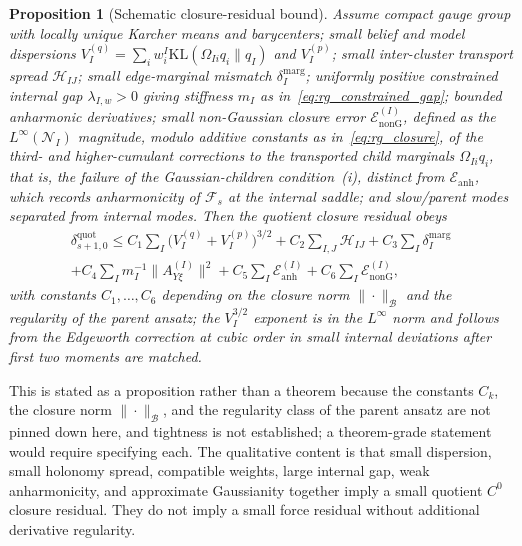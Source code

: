 \documentclass[11pt]{article}
\newtheorem{proposition}{Proposition}
\begin{document}
\begin{proposition}[Schematic closure-residual bound]
\label{thm:rg_residual}
Assume compact gauge group with locally unique Karcher means and barycenters; small belief and model dispersions $V_I^{(q)} = \sum_i w_i^I \mathrm{KL}(\Omega_{Ii}q_i \| q_I)$ and $V_I^{(p)}$; small inter-cluster transport spread $\mathcal{H}_{IJ}$; small edge-marginal mismatch $\delta_I^{\mathrm{marg}}$; uniformly positive constrained internal gap $\lambda_{I,w} > 0$ giving stiffness $m_I$ as in~\eqref{eq:rg_constrained_gap}; bounded anharmonic derivatives; small non-Gaussian closure error $\mathcal{E}_{\mathrm{nonG}}^{(I)}$, defined as the $L^\infty(\mathcal{N}_I)$ magnitude, modulo additive constants as in~\eqref{eq:rg_closure}, of the third- and higher-cumulant corrections to the transported child marginals $\Omega_{Ii}q_i$, that is, the failure of the Gaussian-children condition~(i), distinct from $\mathcal{E}_{\mathrm{anh}}$, which records anharmonicity of $\mathcal{F}_s$ at the internal saddle; and slow/parent modes separated from internal modes. Then the quotient closure residual obeys
\begin{multline}
\delta_{s+1,0}^{\mathrm{quot}} \le C_1\sum_I \big(V_I^{(q)} + V_I^{(p)}\big)^{3/2} + C_2\sum_{I,J}\mathcal{H}_{IJ} + C_3\sum_I \delta_I^{\mathrm{marg}} \\
 + C_4\sum_I m_I^{-1}\|A_{Y\xi}^{(I)}\|^2 + C_5\sum_I \mathcal{E}_{\mathrm{anh}}^{(I)} + C_6\sum_I \mathcal{E}_{\mathrm{nonG}}^{(I)},
\end{multline}
with constants $C_1, \ldots, C_6$ depending on the closure norm $\|\cdot\|_\mathcal{B}$ and the regularity of the parent ansatz; the $V_I^{3/2}$ exponent is in the $L^\infty$ norm and follows from the Edgeworth correction at cubic order in small internal deviations after first two moments are matched.
\end{proposition}

This is stated as a proposition rather than a theorem because the constants $C_k$, the closure norm $\|\cdot\|_\mathcal{B}$, and the regularity class of the parent ansatz are not pinned down here, and tightness is not established; a theorem-grade statement would require specifying each. The qualitative content is that small dispersion, small holonomy spread, compatible weights, large internal gap, weak anharmonicity, and approximate Gaussianity together imply a small quotient $C^0$ closure residual. They do not imply a small force residual without additional derivative regularity.
\end{document}
